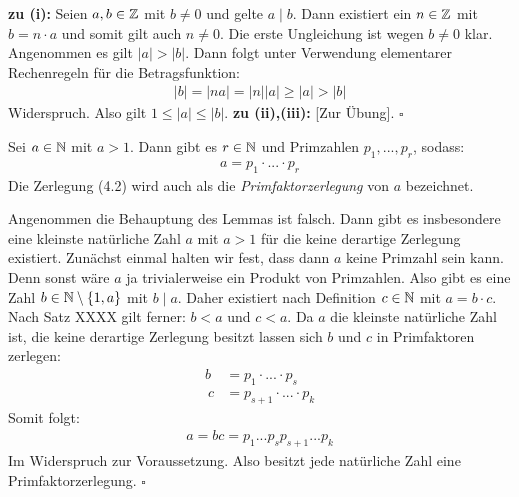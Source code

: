 \begin{proof*}
    \textbf{zu (i):} \newline
    Seien $a,b \in \mathbb{Z}$ mit $b \neq 0$ und gelte $a \mid b$. Dann existiert ein $n \in \mathbb{Z}$ mit $b = n \cdot a$ und somit gilt auch $n \neq 0$. Die erste Ungleichung ist wegen $b \neq 0$ klar. Angenommen es gilt $\lvert a \rvert > \lvert b \rvert$. 
    Dann folgt unter Verwendung elementarer Rechenregeln für die Betragsfunktion: 
    \begin{align*}
        \lvert b \rvert = \lvert n a \rvert = \lvert n \rvert \lvert a \rvert \geq \lvert a \rvert > \lvert b \rvert
    \end{align*}
    Widerspruch. Also gilt $1 \leq \lvert a \rvert \leq \lvert b \rvert$.
    \newline 
    \textbf{zu (ii),(iii):} [Zur Übung]. \hfill $\square$
\end{proof*}

\begin{lemma}
    Sei $a \in \mathbb{N}$ mit $a > 1$. Dann gibt es $r \in \mathbb{N}$ und Primzahlen $p_1,...,p_r$, sodass: 
    \begin{align}
        a = p_1 \cdot ... \cdot p_r
    \end{align}
    Die Zerlegung (4.2) wird auch als die \textit{Primfaktorzerlegung} von $a$ bezeichnet. 
\end{lemma}

\begin{proof*}%
    Angenommen die Behauptung des Lemmas ist falsch. Dann gibt es insbesondere eine kleinste natürliche Zahl $a$ mit $a>1$ für die keine derartige Zerlegung existiert. 
    Zunächst einmal halten wir fest, dass dann $a$ keine Primzahl sein kann. Denn sonst wäre $a$ ja trivialerweise ein Produkt von Primzahlen. 
    Also gibt es eine Zahl $b \in \mathbb{N} \setminus \{1,a\}$ mit $b \mid a$. Daher existiert nach Definition $c \in \mathbb{N}$ mit $a = b \cdot c$. Nach Satz XXXX gilt ferner: 
    $b < a$ und $c < a$. Da $a$ die kleinste natürliche Zahl ist, die keine derartige Zerlegung besitzt lassen sich $b$ und $c$ in Primfaktoren zerlegen: 
    \begin{align*}
        b &= p_1 \cdot ... \cdot p_s \\\
        c &= p_{s+1} \cdot ... \cdot p_k
    \end{align*}
    Somit folgt: 
    \begin{align*}
        a = b c = p_1 ... p_s p_{s+1} ... p_k 
    \end{align*}
    Im Widerspruch zur Voraussetzung. Also besitzt jede natürliche Zahl eine Primfaktorzerlegung. \hfill $\square$
\end{proof*}

